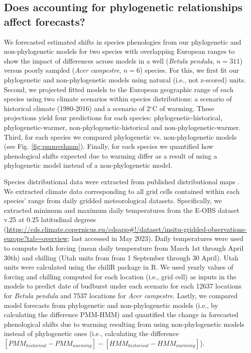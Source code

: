 \documentclass[11pt]{article}
\begin{document}
\subsection*{Does accounting for phylogenetic relationships affect forecasts?}
We forecasted estimated shifts in species phenologies from our phylogenetic and non-phylogenetic models for two species with overlapping European ranges to show the impact of differences across models in a well (\emph{Betula pendula}, $n=311$) versus poorly sampled  (\emph{Acer campestre}, $n=6$) species. For this, we first fit our phylogenetic and non-phylogenetic models using natural (i.e., not z-scored) units. Second, we projected fitted models to the European geographic range of each species using two climate scenarios within species distributions: a scenario of historical climate (1980-2016) and a scenario of 2$^{\circ}$C of warming. These projections yield four predictions for each species: phylogenetic-historical, phylogenetic-warmer, non-phylogenetic-historical and non-phylogenetic-warmer. Third, for each species we compared phylogenetic vs. non-phylogenetic models (see Fig. \ref{fig:pmmvshmm}). Finally, for each species we quantified how phenological shifts expected due to warming differ as a result of using a phylogenetic model instead of a non-phylogenetic model.  

Species distributional data were extracted from published distributional maps \citep{caudullo2017chorological}. We extracted climate data corresponding to all grid cells contained within each species' range from daily gridded meteorological datasets. Specifically, we extracted minimum and maximum daily temperatures from the E-OBS dataset v.25 at 0.25 latitudinal degrees (\url{https://cds.climate.copernicus.eu/cdsapp#!/dataset/insitu-gridded-observations-europe?tab=overview}; last accessed in May 2023). Daily temperatures were used to compute both forcing (mean daily temperature from March 1st through April 30th) and  chilling (Utah units from from 1 September through 30 April). Utah units were calculated using the chillR package in R. We used yearly values of forcing and chilling computed for each location (i.e., grid cell) as inputs in the models to predict date of budburst under each scenario for each 12637 locations for \emph{Betula pendula} and 7537 locations for \emph{Acer campestre}. Lastly, we compared model forecasts from phylogenetic and non-phylogenetic models (i.e., by calculating the difference PMM-HMM) and quantified the change in forecasted phenological shifts due to warming resulting from using non-phylogenetic models instead of phylogenetic ones (i.e., calculating the difference $[PMM_{historical} -PMM_{warming}]-[HMM_{historical}-HMM_{warming}]$).%
\end{document}
